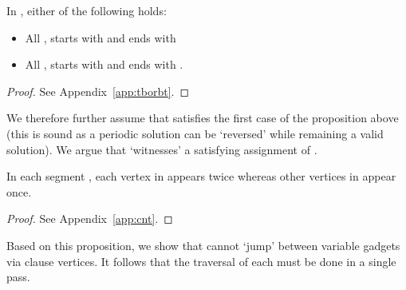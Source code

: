 \documentclass[envcountsame]{llncs}
\begin{document}
\begin{proposition}\label{prop:tborbt}
In , either of the following holds:
\begin{itemize}
\item All ,  starts with  and ends with 
\item All ,  starts with  and ends with .
\end{itemize}
\end{proposition}
\begin{proof}
See Appendix~\ref{app:tborbt}.
\end{proof}
We therefore further assume that  satisfies the first case of the proposition above
(this is sound as a periodic solution can be `reversed' while remaining a valid solution).
We argue that  `witnesses' a satisfying assignment of .
\begin{proposition}\label{prop:exact}
In each segment , each vertex in  appears twice
whereas other vertices in  appear once.
\end{proposition}
\begin{proof}
See Appendix~\ref{app:cnt}.
\end{proof}
Based on this proposition, we show that  cannot `jump' between variable gadgets via clause vertices.
It follows that the traversal of each  must be done in a single pass.
\end{document}
